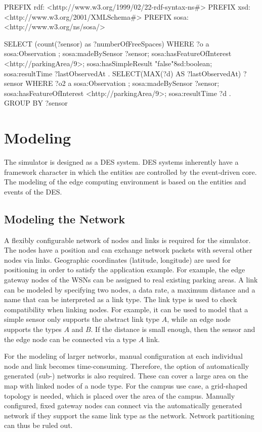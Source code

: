 \documentclass[english,version-2019-11]{uzl-thesis}
\begin{document}
\begin{SPARQL}[caption={Example of a SPARQL query that could be sent to a DBMS instance.},
  float, label=sparql_query_usecase, morekeywords={@prefix}, captionpos=b]
PREFIX rdf: <http://www.w3.org/1999/02/22-rdf-syntax-ns#>
PREFIX xsd: <http://www.w3.org/2001/XMLSchema#>
PREFIX sosa: <http://www.w3.org/ns/sosa/>

SELECT (count(?sensor) as ?numberOfFreeSpaces)
WHERE {
 ?o a sosa:Observation ;
 sosa:madeBySensor ?sensor;
 sosa:hasFeatureOfInterest <http://parkingArea/9>;
 sosa:hasSimpleResult "false"^^xsd:boolean;
 sosa:resultTime ?lastObservedAt .
 {
   SELECT(MAX(?d) AS ?lastObservedAt) ?sensor WHERE {
     ?o2 a sosa:Observation ;
     sosa:madeBySensor ?sensor;
     sosa:hasFeatureOfInterest <http://parkingArea/9>;
     sosa:resultTime ?d .
   }
   GROUP BY ?sensor
 }
}
\end{SPARQL}

\section{Modeling}
The simulator is designed as a DES system. DES systems inherently have a framework character in which the entities are controlled by the event-driven core. The modeling of the edge computing environment is based on the entities and events of the DES.
\subsection{Modeling the Network}
A flexibly configurable network of nodes and links is required for the simulator. The nodes have a position and can exchange network packets with several other nodes via links. Geographic coordinates (latitude, longitude) are used for positioning in order to satisfy the application example. For example, the edge gateway nodes of the WSNs can be assigned to real existing parking areas. A link can be modeled by specifying two nodes, a data rate, a maximum distance and a name that can be interpreted as a link type. The link type is used to check compatibility when linking nodes. For example, it can be used to model that a simple sensor only supports the abstract link type $A$, while an edge node supports the types $A$ and $B$. If the distance is small enough, then the sensor and the edge node can be connected via a type $A$ link.

For the modeling of larger networks, manual configuration at each individual node and link becomes time-consuming. Therefore, the option of automatically generated (sub-) networks is also required. These can cover a large area on the map with linked nodes of a node type. For the campus use case, a grid-shaped topology is needed, which is placed over the area of the campus. Manually configured, fixed gateway nodes can connect via the automatically generated network if they support the same link type as the network. Network partitioning can thus be ruled out.
\end{document}
